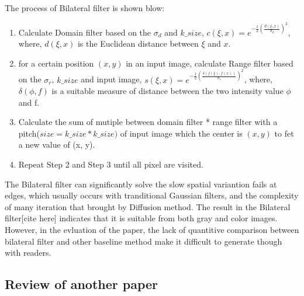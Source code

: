 \documentclass[12pt]{article}
\begin{document}


The process of Bilateral filter is shown blow:
\begin{enumerate}[Step1:]
\item Calculate Domain filter based on the $\sigma_d$ and $k\_size$, $c(\xi, x) = e^{-\frac{1}{2}(\frac{d(\xi, x)}{\sigma_{d}})^2}$, where, $d(\xi, x)$ is the Euclidean distance between $\xi$ and $x$.
\item for a certain position $(x, y)$ in an input image, calculate Range filter based on the $\sigma_r$, $k\_size$ and input image, $s(\xi, x) = e^{-\frac{1}{2}(\frac{\delta(f(\xi), f(x))}{\sigma_{r}})^{2}}$, where, $\delta(\phi, f)$ is a suitable measure of distance between the two intensity value $\phi$ and f.
\item Calculate the sum of mutiple between domain filter * range filter with a pitch($size = k\_size * k\_size)$ of input image which the center is $(x, y)$ to fet a new value of (x, y).
\item Repeat Step 2 and Step 3 until all pixel are visited. 
\end{enumerate}

The Bilateral filter can significantly solve the slow spatial variantion fails at edges, which usually occurs with tranditional Gaussian filters, and the complexity of many iteration that brought by Diffusion method. 
The result in the Bilateral filter[cite here] indicates that it is suitable from both gray and color images. 
However, in the evluation of the paper, the lack of quantitive comparison between bilateral filter and other baseline method make it difficult to generate though with readers.




\subsection{Review of another paper}
\end{document}
